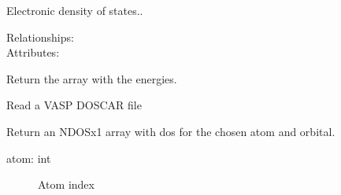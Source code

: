 \documentclass[letterpaper,10pt,english]{sphinxmanual}
\begin{document}
\begin{fulllineitems}
\label{models:qmpy.DOS}
Electronic density of states..
\begin{description}
\item[{Relationships:}] \leavevmode
{}

\item[{Attributes:}] \leavevmode
{}

\end{description}

\begin{fulllineitems}
\label{models:qmpy.DOS.energy}
Return the array with the energies.

\end{fulllineitems}


\begin{fulllineitems}
\label{models:qmpy.DOS.read_doscar}
Read a VASP DOSCAR file

\end{fulllineitems}


\begin{fulllineitems}
\label{models:qmpy.DOS.site_dos}
Return an NDOSx1 array with dos for the chosen atom and orbital.
\begin{description}
\item[{atom: int}] \leavevmode
Atom index


\end{description}
\end{fulllineitems}
\end{fulllineitems}
\end{document}
